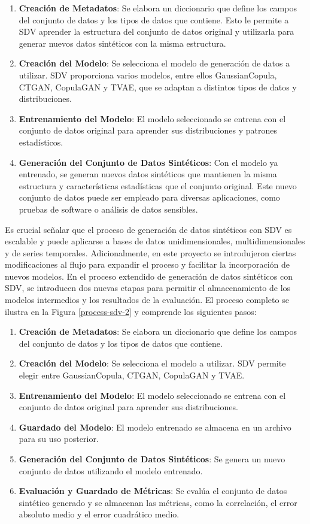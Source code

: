 \begin{enumerate}
    \item \textbf{Creación de Metadatos}: Se elabora un diccionario que define los campos del conjunto de datos y los tipos de datos que contiene. Esto le permite a SDV aprender la estructura del conjunto de datos original y utilizarla para generar nuevos datos sintéticos con la misma estructura.
    \item \textbf{Creación del Modelo}: Se selecciona el modelo de generación de datos a utilizar. SDV proporciona varios modelos, entre ellos GaussianCopula, CTGAN, CopulaGAN y TVAE, que se adaptan a distintos tipos de datos y distribuciones.
    \item \textbf{Entrenamiento del Modelo}: El modelo seleccionado se entrena con el conjunto de datos original para aprender sus distribuciones y patrones estadísticos.
    \item \textbf{Generación del Conjunto de Datos Sintéticos}: Con el modelo ya entrenado, se generan nuevos datos sintéticos que mantienen la misma estructura y características estadísticas que el conjunto original. Este nuevo conjunto de datos puede ser empleado para diversas aplicaciones, como pruebas de software o análisis de datos sensibles.
\end{enumerate}
Es crucial señalar que el proceso de generación de datos sintéticos con SDV es escalable y puede aplicarse a bases de datos unidimensionales, multidimensionales y de series temporales. Adicionalmente, en este proyecto se introdujeron ciertas modificaciones al flujo para expandir el proceso y facilitar la incorporación de nuevos modelos.
\newpage
En el proceso extendido de generación de datos sintéticos con SDV, se introducen dos nuevas etapas para permitir el almacenamiento de los modelos intermedios y los resultados de la evaluación. El proceso completo se ilustra en la Figura \ref{process-sdv-2} y comprende los siguientes pasos:


\begin{enumerate}
    \item \textbf{Creación de Metadatos}: Se elabora un diccionario que define los campos del conjunto de datos y los tipos de datos que contiene.
    \item \textbf{Creación del Modelo}: Se selecciona el modelo a utilizar. SDV permite elegir entre GaussianCopula, CTGAN, CopulaGAN y TVAE.
    \item \textbf{Entrenamiento del Modelo}: El modelo seleccionado se entrena con el conjunto de datos original para aprender sus distribuciones.
    \item \textbf{Guardado del Modelo}: El modelo entrenado se almacena en un archivo para su uso posterior.
    \item \textbf{Generación del Conjunto de Datos Sintéticos}: Se genera un nuevo conjunto de datos utilizando el modelo entrenado.
    \item \textbf{Evaluación y Guardado de Métricas}: Se evalúa el conjunto de datos sintético generado y se almacenan las métricas, como la correlación, el error absoluto medio y el error cuadrático medio.
\end{enumerate}


